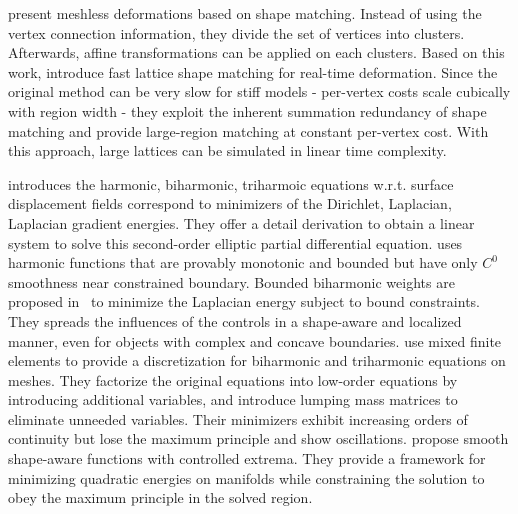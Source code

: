 \cite{muller2005meshless} present meshless deformations based on shape matching. Instead of using the vertex connection information, they divide the set of vertices into clusters. Afterwards, affine transformations can be applied on each clusters. Based on this work, \cite{rivers2007fastlsm} introduce fast lattice shape matching for real-time deformation. Since the original method can be very slow for stiff models - per-vertex costs scale cubically with region width - they exploit the inherent summation redundancy of shape matching and provide large-region matching at constant per-vertex cost. With this approach, large lattices can be simulated in linear time complexity.

\cite{jacobson2013algorithms} introduces the harmonic, biharmonic, triharmoic equations w.r.t. surface displacement fields correspond to minimizers of the Dirichlet, Laplacian, Laplacian gradient energies. They offer a detail derivation to obtain a linear system to solve this second-order elliptic partial differential equation. \cite{weber2007context} uses harmonic functions that are provably monotonic and bounded but have only $C^0$ smoothness near constrained boundary. Bounded biharmonic weights are proposed in~\cite{jacobson2011bounded} to minimize the Laplacian energy subject to bound constraints. They spreads the influences of the controls in a shape-aware and localized manner, even for objects with complex and concave boundaries. \cite{jacobson2010mixed} use mixed finite elements to provide a discretization for biharmonic and triharmonic equations on meshes. They factorize the original equations into low-order equations by introducing additional variables, and introduce lumping mass matrices to eliminate unneeded variables. Their minimizers exhibit increasing orders of continuity but lose the maximum principle and show oscillations. \cite{jacobson2012smooth} propose smooth shape-aware functions with controlled extrema. They provide a framework for minimizing quadratic energies on manifolds while constraining the solution to obey the maximum principle in the solved region.

